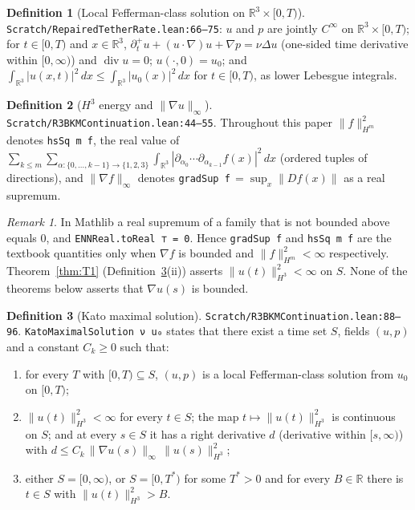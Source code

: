 \documentclass[11pt]{article}
\newcommand{\R}{\mathbb{R}}
\newcommand{\lean}[1]{\texttt{#1}}
\theoremstyle{definition}
\newtheorem{definition}{Definition}
\theoremstyle{remark}
\newtheorem*{remark}{Remark}
\begin{document}
\begin{definition}[Local Fefferman-class solution on $\R^3\times[0,T)$] \lean{Scratch/RepairedTetherRate.lean:66--75}: $u$ and $p$ are jointly $C^\infty$ on $\R^3\times[0,T)$; for $t\in[0,T)$ and $x\in\R^3$, $\partial_t^+u+(u\cdot\nabla)u+\nabla p=\nu\Delta u$ (one-sided time derivative within $[0,\infty)$) and $\operatorname{div}u=0$; $u(\cdot,0)=u_0$; and $\int_{\R^3}|u(x,t)|^2\,dx\le\int_{\R^3}|u_0(x)|^2\,dx$ for $t\in[0,T)$, as lower Lebesgue integrals.
\end{definition}

\begin{definition}[$H^3$ energy and $\|\nabla u\|_\infty$] \lean{Scratch/R3BKMContinuation.lean:44--55}. Throughout this paper $\|f\|_{H^m}^2$ denotes \lean{hsSq m f}, the real value of
$\sum_{k\le m}\sum_{\alpha:\{0,\dots,k-1\}\to\{1,2,3\}}\int_{\R^3}|\partial_{\alpha_0}\cdots\partial_{\alpha_{k-1}}f(x)|^2\,dx$ (ordered tuples of directions), and $\|\nabla f\|_\infty$ denotes \lean{gradSup f}$\,=\sup_x\|Df(x)\|$ as a real supremum.
\end{definition}

\begin{remark}
In Mathlib a real supremum of a family that is not bounded above equals $0$, and \lean{ENNReal.toReal ⊤ = 0}. Hence \lean{gradSup f} and \lean{hsSq m f} are the textbook quantities only when $\nabla f$ is bounded and $\|f\|_{H^m}^2<\infty$ respectively. Theorem~\ref{thm:T1} (Definition~\ref{def:kato}(ii)) asserts $\|u(t)\|_{H^3}^2<\infty$ on $S$. None of the theorems below asserts that $\nabla u(s)$ is bounded.
\end{remark}

\begin{definition}[Kato maximal solution]\label{def:kato} \lean{Scratch/R3BKMContinuation.lean:88--96}. \lean{KatoMaximalSolution ν u₀} states that there exist a time set $S$, fields $(u,p)$ and a constant $C_k\ge 0$ such that:
\begin{enumerate}[label=(\roman*)]
\item for every $T$ with $[0,T)\subseteq S$, $(u,p)$ is a local Fefferman-class solution from $u_0$ on $[0,T)$;
\item $\|u(t)\|_{H^3}^2<\infty$ for every $t\in S$; the map $t\mapsto\|u(t)\|_{H^3}^2$ is continuous on $S$; and at every $s\in S$ it has a right derivative $d$ (derivative within $[s,\infty)$) with $d\le C_k\,\|\nabla u(s)\|_\infty\,\|u(s)\|_{H^3}^2$;
\item either $S=[0,\infty)$, or $S=[0,T^*)$ for some $T^*>0$ and for every $B\in\R$ there is $t\in S$ with $\|u(t)\|_{H^3}^2>B$.
\end{enumerate}
\end{definition}
\end{document}

